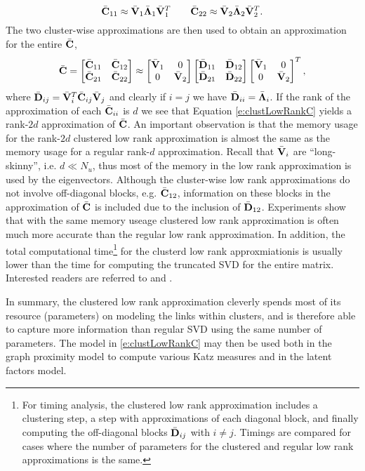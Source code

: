 \[
\bar{\mathbf{C}}_{11} \approx \bar{\mathbf{V}}_1 \bar{\mathbf{\Lambda}}_1 \bar{\mathbf{V}}_1^T \qquad
\bar{\mathbf{C}}_{22} \approx \bar{\mathbf{V}}_2 \bar{\mathbf{\Lambda}}_2 \bar{\mathbf{V}}_2^T.
\]
The two cluster-wise approximations are then used to obtain an approximation for the entire $\bar{\mathbf{C}}$,
\begin{equation}
 \label{e:clustLowRankC}
 \bar{\mathbf{C}} =
\begin{bmatrix}
\bar{\mathbf{C}}_{11} & \bar{\mathbf{C}}_{12} \\
\bar{\mathbf{C}}_{21} & \bar{\mathbf{C}}_{22}
\end{bmatrix} \approx
\begin{bmatrix}
\bar{\mathbf{V}}_1 & 0 \\
0 & \bar{\mathbf{V}}_2
\end{bmatrix}
\begin{bmatrix}
\bar{\mathbf{D}}_{11} & \bar{\mathbf{D}}_{12} \\
\bar{\mathbf{D}}_{21} & \bar{\mathbf{D}}_{22}
\end{bmatrix}
\begin{bmatrix}
\bar{\mathbf{V}}_1 & 0 \\
0 & \bar{\mathbf{V}}_2
\end{bmatrix}^T,
\end{equation}
where $\bar{\mathbf{D}}_{ij} = \bar{\mathbf{V}}_i^T \bar{\mathbf{C}}_{ij} \bar{\mathbf{V}}_j$ and clearly if $i = j$ we have $\bar{\mathbf{D}}_{ii} = \bar{\mathbf{\Lambda}}_{i}$. If the rank of the approximation of each $\bar{\mathbf{C}}_{ii}$ is $d$ we see that Equation \eqref{e:clustLowRankC} yields a rank-$2d$ approximation of $\bar{\mathbf{C}}$. An important observation is that the memory usage for the rank-$2d$ clustered low rank approximation is almost the same as the memory usage for a regular rank-$d$ approximation. Recall that $\bar{\mathbf{V}}_i$ are ``long-skinny'', i.e. $d \ll N_u$, thus most of the memory in the low rank approximation is used by the eigenvectors. Although the cluster-wise low rank approximations do not involve off-diagonal blocks, e.g. $\bar{\mathbf{C}}_{12}$, information on these blocks in the approximation of $\bar{\mathbf{C}}$ is included due to the inclusion of $\bar{\mathbf{D}}_{12}$. Experiments show that with the same memory useage clustered low rank approximation is often much more accurate than the regular low rank approximation. In addition, the total computational time\footnote{
For timing analysis, the clustered low rank approximation includes a clustering step, a step with approximations of each diagonal block, and finally computing the off-diagonal blocks $\bar{\mathbf{D}}_{ij}$ with $i \neq j$. Timings are compared for cases where the number of parameters for the clustered and regular low rank approximations is the same.} for the clusterd low rank approxmiationis is usually lower than the time for computing the truncated SVD for the entire matrix. 
Interested readers are referred to \cite{savas10c} and \cite{song10}.

In summary, the clustered low rank approximation cleverly spends most of its resource (parameters) on modeling the links within clusters, and is therefore able to capture more information than regular SVD using the same number of parameters. The model in \eqref{e:clustLowRankC} may then be used both in the graph proximity model to compute various \textsf{Katz} measures and in the latent factors model.





